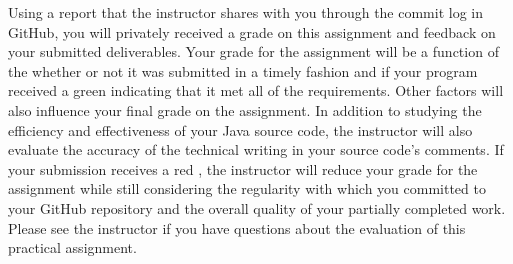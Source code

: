 \documentclass[11pt]{article}
\newcommand{\checkmark}{\ding{51}}
\newcommand{\naughtmark}{\ding{55}}
\begin{document}
Using a report that the instructor shares with you through the commit log in
GitHub, you will privately received a grade on this assignment and feedback on
your submitted deliverables. Your grade for the assignment will be a function of
the whether or not it was submitted in a timely fashion and if your program
received a green \checkmark{} indicating that it met all of the requirements.
Other factors will also influence your final grade on the assignment. In
addition to studying the efficiency and effectiveness of your Java source code,
the instructor will also evaluate the accuracy of the technical writing in your
source code's comments. If your submission receives a red \naughtmark{}, the
instructor will reduce your grade for the assignment while still considering the
regularity with which you committed to your GitHub repository and the overall
quality of your partially completed work. Please see the instructor if you have
questions about the evaluation of this practical assignment.


\end{document}
